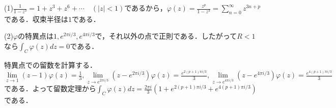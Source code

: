 \documentclass[
		book,
		head_space=20mm,
		foot_space=20mm,
		gutter=10mm,
		line_length=190mm
]{jlreq}
\begin{document}
(1)$\frac{1}{1-z^3}=1+z^3+z^6+\cdots \quad(|z|<1)$であるから，$\varphi(z)=\frac{z^p}{1-z^3}=\sum\limits_{n=0}^{\infty}z^{3n+p}$である．収束半径は$1$である．

(2)$\varphi$の特異点は$1,e^{2\pi i/3},e^{4\pi i/3}$で，それ以外の点で正則である．したがって$R<1$なら$\int_{C}\varphi(z)dz=0$である．

特異点での留数を計算する．$\lim\limits_{z\to 1}(z-1)\varphi(z)=\frac{1}{3},\lim\limits_{z\to e^{2\pi i/3}}(z-e^{2\pi i/3})\varphi(z)=\frac{e^{2(p+1)\pi i/3}}{3},\lim\limits_{z\to e^{4\pi i/3}}(z-e^{4\pi i/3})\varphi(z)=\frac{e^{4(p+1)\pi i/3}}{3}$である．よって留数定理から$\int_{C}\varphi(z)dz=\frac{2\pi i}{3}(1+e^{2(p+1)\pi i/3}+e^{4(p+1)\pi i/3})$である．
\end{document}

